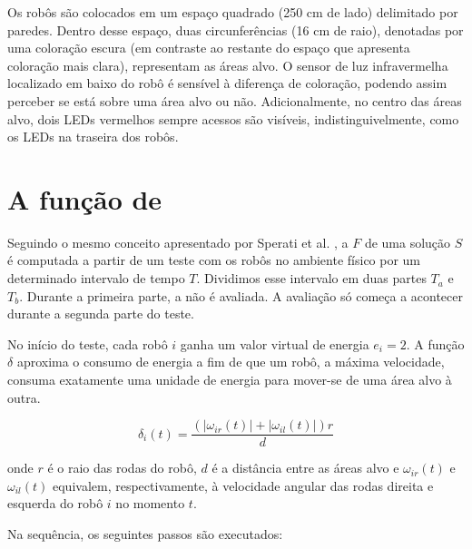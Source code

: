 Os robôs são colocados em um espaço quadrado (250 cm de lado) delimitado por paredes. Dentro desse espaço, duas circunferências (16 cm de raio), denotadas por uma coloração escura (em contraste ao restante do espaço que apresenta coloração mais clara), representam as áreas alvo. O sensor de luz infravermelha localizado em baixo do robô é sensível à diferença de coloração, podendo assim perceber se está sobre uma área alvo ou não. Adicionalmente, no centro das áreas alvo, dois LEDs vermelhos sempre acessos são visíveis, indistinguivelmente, como os LEDs na traseira dos robôs.

\section{A função de \fitness}
\label{sec:fitness}

Seguindo o mesmo conceito apresentado por Sperati et al. \cite{sperati2011path}, a \fitness $F$ de uma solução $S$ é computada a partir de um teste com os robôs no ambiente físico por um determinado intervalo de tempo $T$. Dividimos esse intervalo em duas partes $T_{a}$ e $T_{b}$. Durante a primeira parte, a \fitness não é avaliada. A avaliação só começa a acontecer durante a segunda parte do teste.

No início do teste, cada robô $i$ ganha um valor virtual de energia $e_{i} = 2$. A função $\delta$ aproxima o consumo de energia a fim de que um robô, a máxima velocidade, consuma exatamente uma unidade de energia para mover-se de uma área alvo à outra.

$$
\delta_{i} (t) = \frac{( | \omega_{ir} (t) | + | \omega_{il} (t) |) r}{d}
$$

onde $r$ é o raio das rodas do robô, $d$ é a distância entre as áreas alvo e $\omega_{ir} (t)$ e $\omega_{il} (t)$ equivalem, respectivamente, à velocidade angular das rodas direita e esquerda do robô $i$ no momento $t$.

Na sequência, os seguintes passos são executados:

